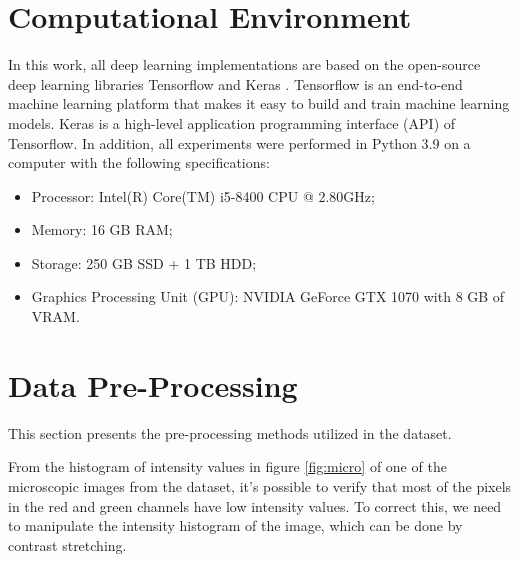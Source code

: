 \cleardoublepage
\label{chap:results}


\section{Computational Environment}

In this work, all deep learning implementations are based on the open-source deep learning libraries Tensorflow and Keras \cite{tensorflow,keras}. Tensorflow is an end-to-end machine learning platform that makes it easy to build and train machine learning models. Keras is a high-level application programming interface (API) of Tensorflow. In addition, all experiments were performed in Python 3.9 on a computer with the following specifications:

\begin{itemize}
    \itemsep0em 
    \item Processor: Intel(R) Core(TM) i5-8400 CPU @ 2.80GHz;
    \item Memory: 16 GB RAM;
    \item Storage: 250 GB SSD + 1 TB HDD;
    \item Graphics Processing Unit (GPU): NVIDIA GeForce GTX 1070 with 8 GB of VRAM.
\end{itemize}


\section{Data Pre-Processing}
\label{section:pre}
This section presents the pre-processing methods utilized in the dataset.

From the histogram of intensity values in figure \ref{fig:micro} of one of the microscopic images from the dataset, it's possible to verify that most of the pixels in the red and green channels have low intensity values. To correct this, we need to manipulate the intensity histogram of the image, which can be done by contrast stretching.

